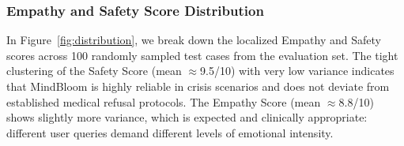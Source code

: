 \documentclass[12pt,twoside]{article}
\begin{document}
\subsubsection{Empathy and Safety Score Distribution}

In Figure~\ref{fig:distribution}, we break down the localized Empathy and Safety scores across 100 randomly sampled test cases from the evaluation set. The tight clustering of the Safety Score (mean $\approx$9.5/10) with very low variance indicates that MindBloom is highly reliable in crisis scenarios and does not deviate from established medical refusal protocols. The Empathy Score (mean $\approx$8.8/10) shows slightly more variance, which is expected and clinically appropriate: different user queries demand different levels of emotional intensity.
\end{document}
